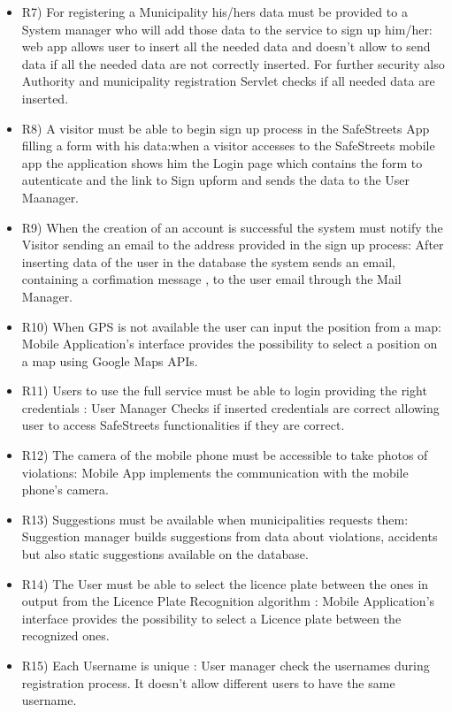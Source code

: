 \begin{itemize}
\item  R7) For registering a Municipality his/hers data must be provided to a System manager who will
add those data to the service to sign up him/her: web app allows user to insert all the needed data and doesn't allow to send data if all the needed data are not correctly inserted. For further security also Authority and municipality registration Servlet checks if all needed data are inserted.
\item  R8) A visitor must be able to begin sign up process in the SafeStreets App filling a form with his
data:when a visitor accesses to the SafeStreets mobile app the application shows him the Login page which contains the form to autenticate and the link to Sign upform and sends the data to the User Maanager.
\item  R9) When the creation of an account is successful the system must notify the Visitor sending an
email to the address provided in the sign up process: After inserting data of the user in the database the system sends an email, containing a corfimation message , to the user email through the Mail Manager.
\item  R10) When GPS is not available the user can input the position from a map: Mobile Application's interface provides the possibility to select a position on a map using Google Maps APIs.
\item  R11) Users to use the full service must be able to login providing the right credentials : User Manager Checks if inserted credentials are correct allowing user to access SafeStreets functionalities if they are correct.
\item  R12) The camera of the mobile phone must be accessible to take photos of violations: Mobile App implements the communication with the mobile phone's camera.
\item  R13) Suggestions must be available when municipalities requests them: Suggestion manager builds suggestions from data about violations, accidents but also static suggestions available on the database.
\item  R14) The User must be able to select the licence plate between the ones in output from the Licence
Plate Recognition algorithm :  Mobile Application's interface provides the possibility to select a Licence plate between the recognized ones.
\item  R15) Each Username is unique : User manager check the usernames during registration process. It doesn't allow different users to have the same username.
\end{itemize}
\clearpage
